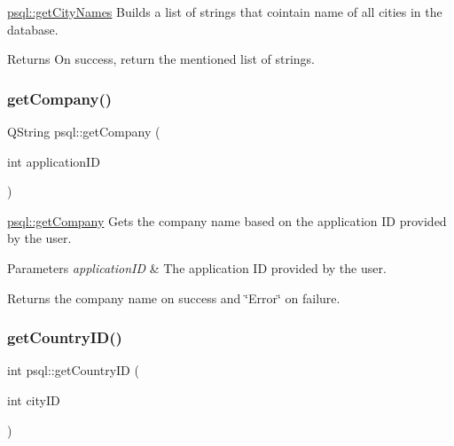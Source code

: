 \mbox{\hyperlink{classpsql_a42ee0cf90055ba6a7a6f564cf04d8bb8}{psql\+::get\+City\+Names}} Builds a list of strings that cointain name of all cities in the database. 

\begin{DoxyReturn}{Returns}
On success, return the mentioned list of strings. 
\end{DoxyReturn}
\mbox{\label{classpsql_a09745cd03f09ffb2dacacaab4281915f}} 
\subsubsection{\texorpdfstring{getCompany()}{getCompany()}}
{\footnotesize\ttfamily Q\+String psql\+::get\+Company (\begin{DoxyParamCaption}\item[{int}]{application\+ID }\end{DoxyParamCaption})}



\mbox{\hyperlink{classpsql_a09745cd03f09ffb2dacacaab4281915f}{psql\+::get\+Company}} Gets the company name based on the application ID provided by the user. 


\begin{DoxyParams}{Parameters}
{\em application\+ID} & The application ID provided by the user. \\
\hline
\end{DoxyParams}
\begin{DoxyReturn}{Returns}
the company name on success and \char`\"{}\+Error\char`\"{} on failure. 
\end{DoxyReturn}
\mbox{\label{classpsql_a81d02dc0350ba11d90257914078ba432}} 
\subsubsection{\texorpdfstring{getCountryID()}{getCountryID()}\hspace{0.1cm}{\footnotesize\ttfamily [1/2]}}
{\footnotesize\ttfamily int psql\+::get\+Country\+ID (\begin{DoxyParamCaption}\item[{int}]{city\+ID }\end{DoxyParamCaption})}



